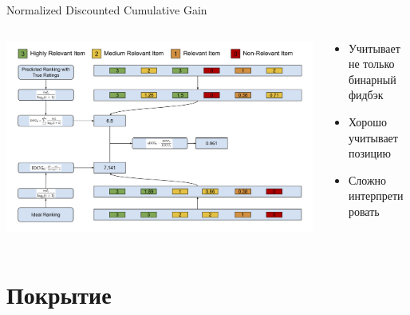 \documentclass[11pt,aspectratio=169,handout]{beamer}
\begin{document}
\begin{frame}{Normalized Discounted Cumulative Gain}

\begin{columns}
\begin{column}{0.5\textwidth}
   \begin{center}
		\includegraphics[scale=0.055]{images/ndcg.png}
   \end{center}
\end{column}
\begin{column}{0.4\textwidth}
    \begin{tcolorbox}[colback=info!5,colframe=info!80,title=]
      \begin{itemize}
      \item Учитывает не только бинарный фидбэк
      \item Хорошо учитывает позицию
      \end{itemize}
    \end{tcolorbox}
    \begin{tcolorbox}[colback=warn!5,colframe=warn!80,title=]
      \begin{itemize}
      \item Сложно интерпретировать
      \end{itemize}
    \end{tcolorbox}
\end{column}
\end{columns}

\end{frame}

\section{Покрытие}
\end{document}
